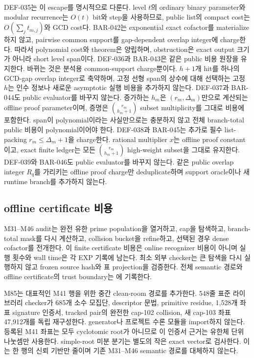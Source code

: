 \documentclass[11pt]{article}
\begin{document}
DEF-035는 이 escape를 명시적으로 다룬다. level \(t\)의 ordinary binary
parameter와 modular recurrence는 \(O(t)\) bit와 step을 사용하므로,
public list의 compact cost는 \(O(\sum_jt_{m,j})\)와 GCD cost다.
BAR-042는 exponential exact cofactor를 materialize하지 않고,
pairwise common support를 gap-dependent overlap integer에 charge한다.
따라서 polynomial cost와 theorem은 양립하며, obstruction은 exact
output 크기가 아니라 short level span이다.
DEF-036과 BAR-043은 같은 public 비용 원장을 유지한다. 바뀌는 것은
분석용 common-support charge뿐이다. \(h+1\)개 hit를 하나의 GCD-gap
overlap integer로 축약하며, 고정 선형 span의 상수에 대해 선택하는
고정 \(h\)는 인수 정보나 새로운 asymptotic 실행 비용을 추가하지
않는다.
DEF-037과 BAR-044도 public evaluator를 바꾸지 않는다. 증가하는
\(h_m\)은 \((r_m,\Delta_m)\)만으로 계산되는 offline proof
parameter이며, 증명은 \(\binom{r_m}{h_m+1}\) subset multiplicity를
그대로 비용에 포함한다. span이 polynomial이라는 사실만으로는
충분하지 않고 전체 branch-total public 비용이 polynomial이어야 한다.
DEF-038과 BAR-045는 추가로 필수 list-packing
\(r_m\le\Delta_m+1\)을 charge한다. rational multiplier \(x\)는 offline
proof constant이고, exact finite ledger는 모든
\(\binom{r_m}{h_m+1}\) high-weight subset을 그대로 유지한다.
DEF-039와 BAR-046도 public evaluator를 바꾸지 않는다. 같은 public
overlap integer \(R_q\)를 가리키는 offline proof charge만
deduplicate하며 support oracle이나 새 runtime branch를 추가하지 않는다.

\subsection{offline certificate 비용}

M31--M46 audit는 완전 유한 prime population을 열거하고, cap을
탐색하고, branch-total mask를 다시 계산하고, collision bucket을
refine하고, 선택된 경우 dense cofactor를 전개한다. 이 finite
certificate 비용은 online recognizer 비용이 아니며 실행 횟수와
wall time은 각 EXP 기록에 남는다. 최소 외부 checker는 큰 탐색을
다시 실행하지 않고 frozen source hash와 표 projection을 검증한다.
전체 semantic 경로와 offline certificate의 trust boundary는
에 기록한다.

M85는 대표적인 M41 행을 위한 중간 clean-room 경로를 추가한다.
548줄 표준 라이브러리 checker가 685개 소수 모집단, descriptor 문법,
primitive residue, 1,528개 좌표 signature 인증서, tracked pair의 완전한
cap-102 collision, 새 cap-103 좌표 47,912개를 독립 재구성한다.
generator나 프로젝트 수론 모듈을 import하지 않는다. 등록된 M41
좌표는 모두 cyclotomic root가 아니므로 이 인증서 근거는 유한체 단위
나눗셈만 사용한다. simple-root 미분 분기는 별도의 작은 exact vector로
검사한다. 이는 한 행의 신뢰 기반만 줄이며 기존 M31--M46 semantic
경로를 대체하지 않는다.
\end{document}
